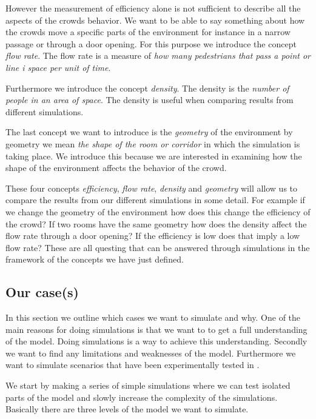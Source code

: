 However the measurement of efficiency alone is not sufficient to describe all 
the aspects of the crowds behavior. We want to be able to say something about 
how the crowds move a specific parts of the environment for instance in a 
narrow passage or through a door opening. For this purpose we introduce the 
concept \emph{flow rate}. The flow rate is a measure of \emph{how many pedestrians 
that pass a point or line i space per unit of time}.

Furthermore we introduce the concept \emph{density}. The density is the \emph{number 
of people in an area of space}. The density is useful when comparing results from 
different simulations. 

The last concept we want to introduce is the \emph{geometry} of the environment 
by geometry we mean \emph{the shape of the room or corridor} in which the simulation 
is taking place. We introduce this because we are interested in examining how 
the shape of the environment affects the behavior of the crowd.

These four concepts \emph{efficiency}, \emph{flow rate}, \emph{density} and 
\emph{geometry} will allow us to compare the results from our different simulations 
in some detail. For example if we change the geometry of the environment how does 
this change the efficiency of the crowd? If two rooms have the same geometry 
how does the density affect the flow rate through a door opening? If the efficiency 
is low does that imply a low flow rate? These are all questing that can be answered 
through simulations in the framework of the concepts we have just defined.    

\subsection{Our case(s)}
In this section we outline which cases we want to simulate and why.
One of the main reasons for doing simulations is that we want to to get 
a full understanding of the model. Doing simulations is a way to achieve this
understanding. Secondly we want to find any limitations and weaknesses of the 
model. Furthermore we want to simulate scenarios that have been experimentally 
tested in \citep{self-org}.

We start by making a series of simple simulations  where we can test isolated parts 
of the model and slowly increase the complexity of the simulations. Basically there 
are three levels of the model we want to simulate. 

